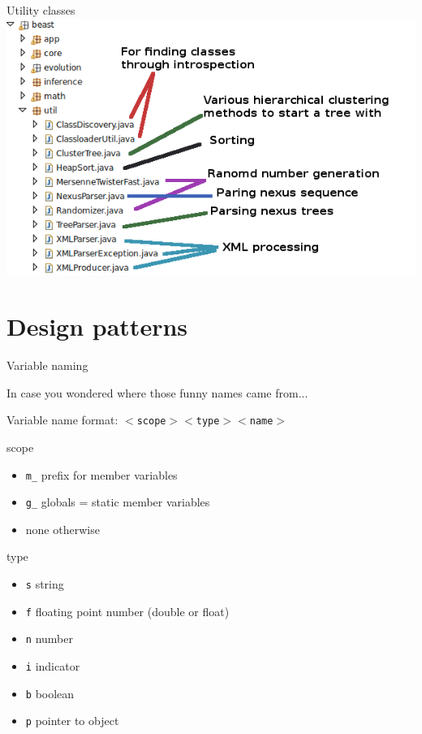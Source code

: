 \documentclass{beamer}
\theoremstyle{definition}
\begin{document}
\begin{frame}[containsverbatim]{Utility classes}
\includegraphics[width=\textwidth]{classes12.png}
\end{frame}




\section{Design patterns}

\begin{frame}[containsverbatim]{Variable naming}

{\small In case you wondered where those funny names came from...}\vskip0.5cm

Variable name format: {\tt$<$scope$> <$type$> <$name$>$}

scope 
\begin{itemize}
\item {\tt m\_} prefix for member variables
\item {\tt g\_} globals = static member variables
\item none otherwise
\end{itemize}

type
\begin{itemize}
\item {\tt s} string
\item {\tt f} floating point number (double or float)
\item {\tt n} number
\item {\tt i} indicator
\item {\tt b} boolean
\item {\tt p} pointer to object
\end{itemize}


\end{frame}
\end{document}
